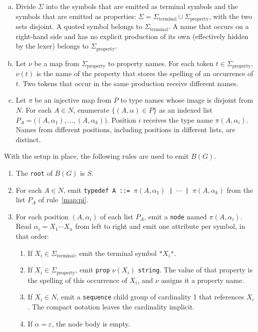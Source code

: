 \documentclass[]{report}
\begin{document}
\begin{enumerate}[(a)]
  \item \label{map:sigma}
    Divide $\Sigma$ into the symbols that are emitted as terminal symbols and the symbols that are emitted as properties:
    $\Sigma = \Sigma_{\mathrm{terminal}} \cup \Sigma_{\mathrm{property}}$,
    with the two sets disjoint. A quoted symbol belongs to $\Sigma_{\mathrm{terminal}}$. A name that occurs on a right-hand side and has no explicit production of its own (effectively hidden by the lexer) belongs to $\Sigma_{\mathrm{property}}$.
  \item \label{map:nu}
    Let $\nu$ be a map from $\Sigma_{\mathrm{property}}$ to property names.
    For each token $t \in \Sigma_{\mathrm{property}}$, $\nu(t)$ is the name of the property that stores the spelling of an occurrence of $t$.
    Two tokens that occur in the same production receive different names.
  \item \label{map:pi}
    Let $\pi$ be an injective map from $P$ to type names whose image is disjoint from $N$.
    For each $A \in N$, enumerate $\{(A, \alpha) \in P\}$ as an indexed list
    $P_A = \bigl((A, \alpha_1), \ldots, (A, \alpha_k)\bigr)$.
    Position $i$ receives the type name $\pi(A, \alpha_i)$.
    Names from different positions, including positions in different lists, are distinct.
\end{enumerate}

With the setup in place, the following rules are used to emit $B(G)$.

\begin{enumerate}
  \item \label{map:root}
    The \texttt{root} of $B(G)$ is $S$.
\item \label{map:typedef}
  For each $A \in N$, emit
  \texttt{typedef A ::= $\pi(A, \alpha_1)$ | $\cdots$ | $\pi(A, \alpha_k)$}
  from the list $P_A$ of rule~\ref{map:pi}.
\item \label{map:node}
  For each position $(A, \alpha_i)$ of each list $P_A$, emit a \texttt{node} named $\pi(A, \alpha_i)$.
  Read $\alpha_i = X_1 \cdots X_n$ from left to right and emit one attribute per symbol, in that order:
  \begin{enumerate}
      \item \label{map:terminal}
        If $X_i \in \Sigma_{\mathrm{terminal}}$, emit the terminal symbol \texttt{"$X_i$"}.
      \item \label{map:property}
        If $X_i \in \Sigma_{\mathrm{property}}$, emit \texttt{prop} $\nu(X_i)$ \texttt{string}. The value of that property is the spelling of this occurrence of $X_i$, and $\nu$ assigns it a property name.
      \item \label{map:nonterminal}
        If $X_i \in N$, emit a \texttt{sequence} child group of cardinality 1 that references $X_i$. The compact notation leaves the cardinality implicit.
      \item \label{map:epsilon}
        If $\alpha = \varepsilon$, the node body is empty.
    \end{enumerate}
\end{enumerate}
\end{document}
